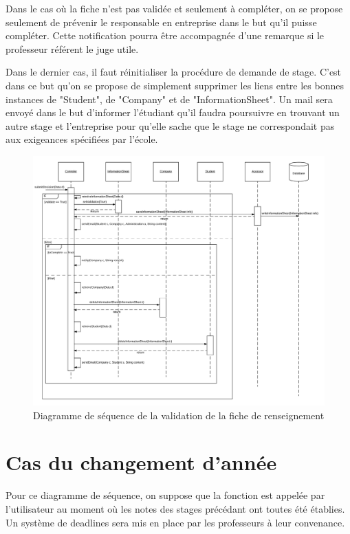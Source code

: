 \documentclass{scrreprt}
\begin{document}
	Dans le cas où la fiche n'est pas validée et seulement à compléter, on se propose seulement de prévenir le responsable en entreprise dans 
le but qu'il puisse compléter. Cette notification pourra être accompagnée d'une remarque si le professeur référent le juge utile. 

	Dans le dernier cas, il faut réinitialiser la procédure de demande de stage. C'est dans ce but qu'on se propose de simplement supprimer 
les liens entre les bonnes instances de "Student", de "Company" et de "InformationSheet". Un mail sera envoyé dans le but d'informer l'étudiant
qu'il faudra poursuivre en trouvant un autre stage et l'entreprise pour qu'elle sache que le stage ne correspondait pas aux exigeances spécifiées
par l'école. 

\newpage
\begin{figure}[h]
\centering
\includegraphics[width=15cm]{images/validationSeqDiagram.png}
\caption{Diagramme de séquence de la validation de la fiche de renseignement}
\end{figure}

\newpage
\section{Cas du changement d'année}

	Pour ce diagramme de séquence, on suppose que la fonction est appelée par l'utilisateur au moment où les notes des stages
précédant ont toutes été établies. Un système de deadlines sera mis en place par les professeurs à leur convenance. 
\end{document}
